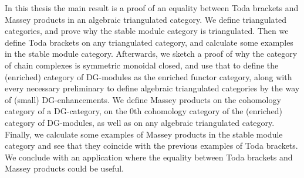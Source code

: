 In this thesis the main result is a proof of an equality between Toda brackets and Massey products in an algebraic triangulated category. We define triangulated categories, and prove why the stable module category is triangulated. Then we define Toda brackets on any triangulated category, and calculate some examples in the stable module category. Afterwards, we sketch a proof of why the category of chain complexes is symmetric monoidal closed, and use that to define the (enriched) category of DG-modules as the enriched functor category, along with every necessary preliminary to define algebraic triangulated categories by the way of (small) DG-enhancements. We define Massey products on the cohomology category of a DG-category, on the 0th cohomology category of the (enriched) category of DG-modules, as well as on any algebraic triangulated category. Finally, we calculate some examples of Massey products in the stable module category and see that they coincide with the previous examples of Toda brackets. We conclude with an application where the equality between Toda brackets and Massey products could be useful.